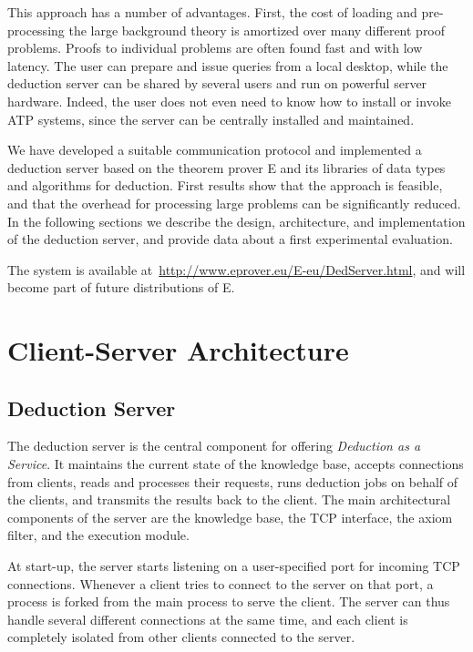 \documentclass{article}
\begin{document}
This approach has a number of advantages. First, the cost of loading
and pre-processing the large background theory is amortized over many
different proof problems. Proofs to individual problems are often
found fast and with low latency. The user can prepare and issue
queries from a local desktop, while the deduction server can be shared
by several users and run on powerful server hardware. Indeed, the user
does not even need to know how to install or invoke ATP systems, since
the server can be centrally installed and maintained. 

We have developed a suitable communication protocol and implemented a
deduction server based on the theorem prover
E\cite{Schulz:AICOM-2002,Schulz:LPAR-2013} and its libraries of data
types and algorithms for deduction. First results show that the
approach is feasible, and that the overhead for processing large
problems can be significantly reduced. In the following sections we
describe the design, architecture, and implementation of the deduction
server, and provide data about a first experimental evaluation.

The system is available
at~\url{http://www.eprover.eu/E-eu/DedServer.html}, and will become
part of future distributions of E.


\section{Client-Server Architecture}

\subsection{Deduction Server}

The deduction server is the central component for offering
\emph{Deduction as a Service}. It maintains the current state of the
knowledge base, accepts connections from clients, reads and processes
their requests, runs deduction jobs on behalf of the clients, and
transmits the results back to the client. The main architectural
components of the server are the knowledge base, the TCP interface,
the axiom filter, and the execution module.

At start-up, the server starts listening on a user-specified port for
incoming TCP connections. Whenever a client tries to connect to the
server on that port, a process is forked from the main process to
serve the client. The server can thus handle several different
connections at the same time, and each client is completely isolated
from other clients connected to the server.
\end{document}
